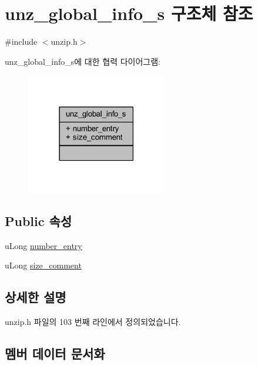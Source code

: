 \hypertarget{structunz__global__info__s}{}\section{unz\+\_\+global\+\_\+info\+\_\+s 구조체 참조}
\label{structunz__global__info__s}


{\ttfamily \#include $<$unzip.\+h$>$}



unz\+\_\+global\+\_\+info\+\_\+s에 대한 협력 다이어그램\+:\nopagebreak
\begin{figure}[H]
\begin{center}
\leavevmode
\includegraphics[width=174pt]{structunz__global__info__s__coll__graph}
\end{center}
\end{figure}
\subsection*{Public 속성}
\begin{DoxyCompactItemize}
\item 
u\+Long \mbox{\hyperlink{structunz__global__info__s_a827d1cd1d09f12acd6c2ee12494cb320}{number\+\_\+entry}}
\item 
u\+Long \mbox{\hyperlink{structunz__global__info__s_a10b58ab57b62301de813ecac0e974363}{size\+\_\+comment}}
\end{DoxyCompactItemize}


\subsection{상세한 설명}


unzip.\+h 파일의 103 번째 라인에서 정의되었습니다.



\subsection{멤버 데이터 문서화}
\mbox{\label{structunz__global__info__s_a827d1cd1d09f12acd6c2ee12494cb320}} 
